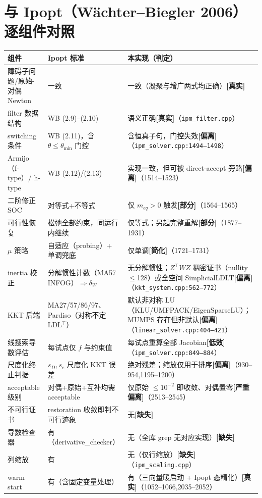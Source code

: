 \documentclass[11pt,a4paper]{ctexart}
\newcommand{\file}[1]{\texttt{#1}}
\begin{document}
\section{与 Ipopt（Wächter--Biegler 2006）逐组件对照}

\begin{center}\footnotesize
\begin{longtable}{@{}p{4.6cm}p{4.2cm}p{5.6cm}@{}}
\toprule
组件 & Ipopt 标准 & 本实现（判定） \\
\midrule
\endhead
障碍子问题/原始-对偶 Newton & 一致 & 一致（凝聚与增广两式均正确）\textbf{[真实]} \\
filter 数据结构 & WB (2.9)--(2.10) & 语义正确\textbf{[真实]}（\file{ipm\_filter.cpp}） \\
switching 条件 & WB (2.11)，含 $\theta\le\theta_{\min}$ 门控 & 含恒真子句，门控失效\textbf{[偏离]}（\file{ipm\_solver.cpp:1494--1498}） \\
Armijo（f-type）/ h-type & WB (2.12)/(2.13) & 实现一致，但可被 direct-accept 旁路\textbf{[偏离]}（1514--1523） \\
二阶修正 SOC & 对等式+不等式 & 仅 $m_{eq}>0$ 触发\textbf{[部分]}（1564--1565） \\
可行性恢复 & 松弛全部约束，同运行内继续 & 仅等式；另起完整重解\textbf{[部分]}（1877--1931） \\
$\mu$ 策略 & 自适应（probing）+ 单调兜底 & 仅单调\textbf{[简化]}（1721--1731） \\
inertia 校正 & 分解惯性计数（MA57 INFOG）$\Rightarrow \delta_W$ & 无分解惯性；$Z^{\top}WZ$ 稠密证书（nullity$\le$128）或全空间 SimplicialLDLT\textbf{[偏离]}（\file{kkt\_system.cpp:562--772}） \\
KKT 后端 & MA27/57/86/97、Pardiso（对称不定 LDL$^{\top}$） & 默认非对称 LU（KLU/UMFPACK/EigenSparseLU）；MUMPS 存在但非默认\textbf{[偏离]}（\file{linear\_solver.cpp:404--421}） \\
线搜索导数评估 & 每试点仅 $f$ 与约束值 & 每试点重算全部 Jacobian\textbf{[低效]}（\file{ipm\_solver.cpp:849--884}） \\
尺度化终止判据 & $s_D,s_c$ 尺度化 KKT 误差 & 绝对残差；缩放仅用于排序\textbf{[偏离]}（930--954,1195--1200） \\
acceptable 级别 & 对偶+原始+互补均需 acceptable & 仅原始 $\le 10^{-2}$ 即收敛、对偶置零\textbf{[严重偏离]}（2513--2545） \\
不可行证书 & restoration 收敛即判不可行迹象 & 无\textbf{[缺失]} \\
导数检查器 & 有（derivative\_checker） & 无（全库 grep 无对应实现）\textbf{[缺失]} \\
列缩放 & 有 & 无（仅行缩放）\textbf{[缺失]}（\file{ipm\_scaling.cpp}） \\
warm start & 有（含固定变量处理） & 有（三向量暖启动 + Ipopt 态精化）\textbf{[真实]}（1052--1066,2035--2052） \\
\bottomrule
\end{longtable}
\end{center}
\end{document}
